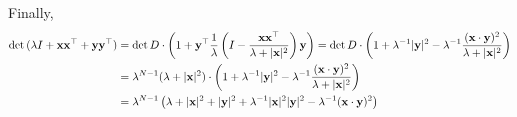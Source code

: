 \documentclass[12pt]{article}
\begin{document}
Finally,
\begin{align*}
\det{(\lambda I + \bf{x} \bf{x}^\top + \bf{y} \bf{y}^\top)} & = \det{D} \cdot \left(1 + \bf{y}^\top \frac{1}{\lambda} \left( I - \frac{\bf{x} \bf{x}^\top}{\lambda + |\bf{x}|^2} \right)  \bf{y} \right) = \det{D} \cdot \left(1 + \lambda^{-1} |\bf{y}|^2 - \lambda^{-1} \frac{(\bf{x} \cdot \bf{y})^2}{\lambda + |\bf{x}|^2} \right)
\\
& = \lambda^{N-1} (\lambda + |\bf{x}|^2) \cdot \left(1 + \lambda^{-1} |\bf{y}|^2 - \lambda^{-1} \frac{(\bf{x} \cdot \bf{y})^2}{\lambda + |\bf{x}|^2} \right)
\\
& = \lambda^{N - 1} \left( \lambda + |\bf{x}|^2 + |\bf{y}|^2 + \lambda^{-1} |\bf{x}|^2 |\bf{y}|^2 - \lambda^{-1} (\bf{x} \cdot \bf{y})^2 \right)
\end{align*}
\end{document}
